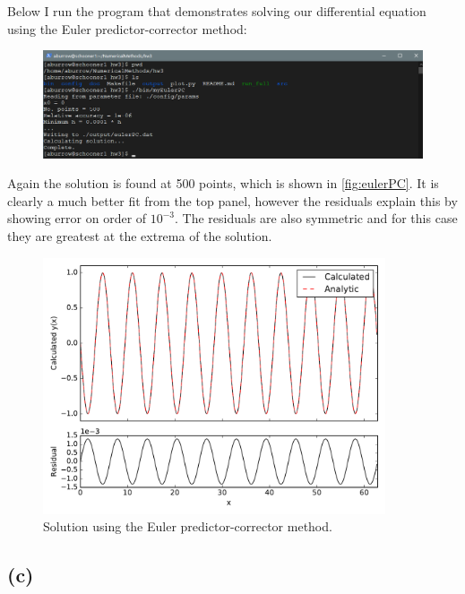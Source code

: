 \documentclass[12pt]{article}
\begin{document}
Below I run the program that demonstrates solving our differential equation
using the Euler predictor-corrector method:
\begin{figure}[H]
    \centering
    \includegraphics[width=1\textwidth]{myEulerPC}
    \label{fig:myEulerPC}
\end{figure}
Again the solution is found at 500 points, which is shown in
\autoref{fig:eulerPC}. It is clearly a much better fit from the top panel,
however the residuals explain this by showing error on order of $10^{-3}$. The
residuals are also symmetric and for this case they are greatest at the extrema
of the solution.
\begin{figure}[ht]
    \centering
    \includegraphics[width=0.9\textwidth]{eulerPC}
    \caption{Solution using the Euler predictor-corrector method.}
    \label{fig:eulerPC}
\end{figure}

\subsection*{(c)}
\end{document}
